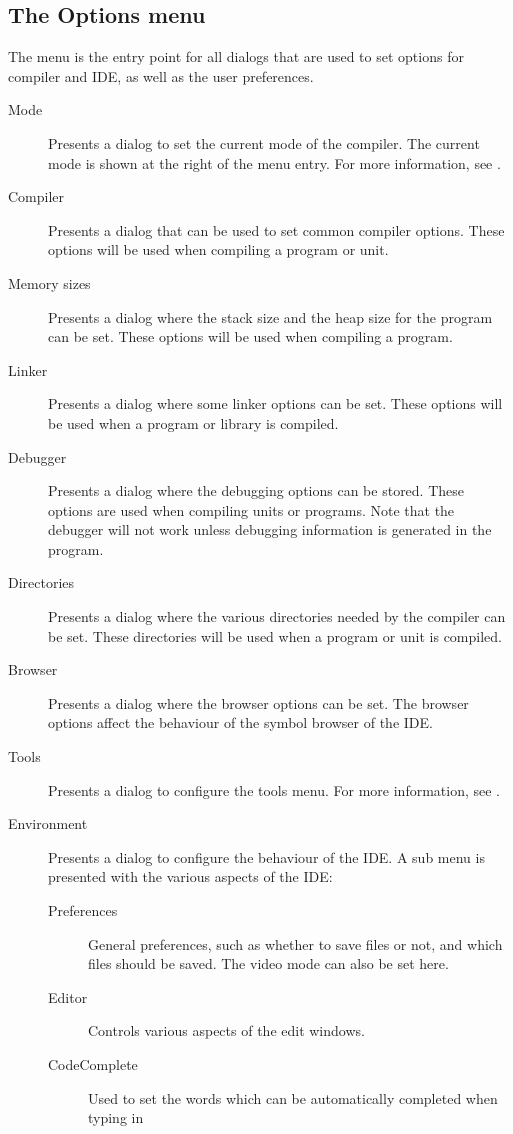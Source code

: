 \subsection{The Options menu}
\label{se:menuoptions}
The  menu is the entry point for all dialogs that are used to set
options for compiler and IDE, as well as the user preferences.
\begin{description}
\item[Mode] Presents a dialog to set the current mode of the compiler. The
current mode is shown at the right of the menu entry. For more information,
see .
\item[Compiler] Presents a dialog that can be used to set common compiler
options. These options will be used when compiling a program or unit.
\item[Memory sizes]
Presents a dialog where the stack size and the heap size for the program can
be set. These options will be used when compiling a program.
\item[Linker]
Presents a dialog where some linker options can be set. These options will
be used when a program or library is compiled.
\item[Debugger]
Presents a dialog where the debugging options can be stored. These options
are used when compiling units or programs. Note that the debugger will not
work unless debugging information is generated in the program.
\item[Directories]
Presents a dialog where the various directories needed by the compiler can
be set. These directories will be used when a program or unit is compiled.
\item[Browser]
Presents a dialog where the browser options can be set. The browser options
affect the behaviour of the symbol browser of the IDE.
\item[Tools]
Presents a dialog to configure the tools menu. For more information, see
.
\item[Environment]
Presents a dialog to configure the behaviour of the IDE. A sub menu is
presented with the various aspects of the IDE:
\begin{description}
\item[Preferences]
General preferences, such as whether to save files or not, and which files
should be saved. The video mode can also be set here.
\item[Editor]
Controls various aspects of the edit windows.
\item[CodeComplete]
Used to set the words which can be automatically completed when typing in

\end{description}
\end{description}
